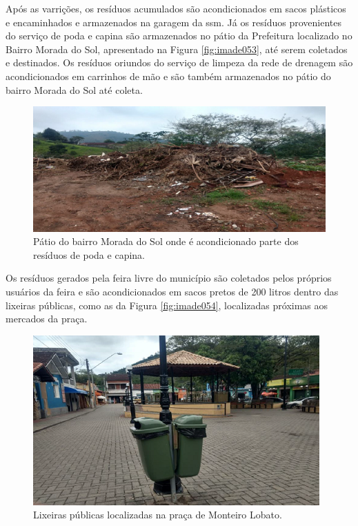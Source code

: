 	Após as varrições, os resíduos acumulados são acondicionados em sacos plásticos e encaminhados e armazenados na garagem da \gls{ssm}.  Já os resíduos provenientes do serviço de poda e capina são armazenados no pátio da Prefeitura localizado no Bairro Morada do Sol, apresentado na Figura \ref{fig:imade053}, até serem coletados e destinados. Os resíduos oriundos do serviço de limpeza da rede de drenagem são acondicionados em carrinhos de mão e são também armazenados no pátio do bairro Morada do Sol até coleta.
	
	\begin{figure}
		\centering
		\includegraphics[width=0.75\linewidth]{produtos/prodtres/image053}
		\caption{Pátio do bairro Morada do Sol onde é acondicionado parte dos resíduos de poda e capina.}
		\label{fig:image053}
	\end{figure}
	
	
	Os resíduos gerados pela feira livre do município são coletados pelos próprios usuários da feira e são acondicionados em sacos pretos de 200 litros dentro das lixeiras públicas, como as da Figura \ref{fig:imade054}, localizadas próximas aos mercados da praça.
	
	\begin{figure}
		\centering
		\includegraphics[width=0.75\linewidth]{produtos/prodtres/image054}
		\caption{Lixeiras públicas localizadas na praça de Monteiro Lobato.}
		\label{fig:image054}
	\end{figure}
	
